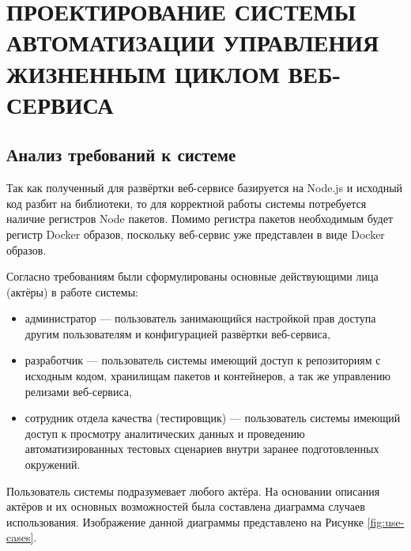 \chapter{ПРОЕКТИРОВАНИЕ СИСТЕМЫ АВТОМАТИЗАЦИИ УПРАВЛЕНИЯ ЖИЗНЕННЫМ ЦИКЛОМ ВЕБ-СЕРВИСА}
\label{cha:design}

\section{Анализ требований к системе}

Так как полученный для развёртки веб-сервисе базируется на Node.js и исходный код разбит на библиотеки, то для корректной
работы системы потребуется наличие регистров Node пакетов.
Помимо регистра пакетов необходимым будет регистр Docker образов, поскольку веб-сервис уже представлен в виде Docker образов.

Согласно требованиям были сформулированы основные действующими лица (актёры) в работе системы:
\begin{itemize}
    \item администратор --- пользователь занимающийся настройкой прав доступа другим пользователям
        и конфигурацией развёртки веб-сервиса,
    \item разработчик --- пользователь системы имеющий доступ к репозиториям с исходным кодом,
        хранилищам пакетов и контейнеров, а так же управлению релизами веб-сервиса,
    \item сотрудник отдела качества (тестировщик) --- пользователь системы имеющий доступ к просмотру аналитических данных и
        проведению автоматизированных тестовых сценариев внутри заранее подготовленных окружений.
\end{itemize}

Пользователь системы подразумевает любого актёра.
На основании описания актёров и их основных возможностей была составлена диаграмма случаев использования.
Изображение данной диаграммы представлено на Рисунке \ref{fig:use-cases}.

